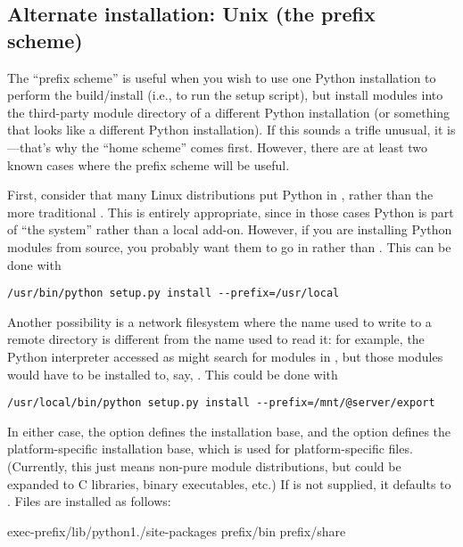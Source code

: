 \documentclass{howto}
\begin{document}
\subsection{Alternate installation: Unix (the prefix scheme)}
\label{alt-unix-home}

The ``prefix scheme'' is useful when you wish to use one Python
installation to perform the build/install (i.e., to run the setup
script), but install modules into the third-party module directory of a
different Python installation (or something that looks like a different
Python installation).  If this sounds a trifle unusual, it is---that's
why the ``home scheme'' comes first.  However, there are at least two
known cases where the prefix scheme will be useful.

First, consider that many Linux distributions put Python in ,
rather than the more traditional .  This is entirely
appropriate, since in those cases Python is part of ``the system''
rather than a local add-on.  However, if you are installing Python
modules from source, you probably want them to go in
 rather than
.  This can be done with
\begin{verbatim}
/usr/bin/python setup.py install --prefix=/usr/local
\end{verbatim}

Another possibility is a network filesystem where the name used to write
to a remote directory is different from the name used to read it: for
example, the Python interpreter accessed as 
might search for modules in ,
but those modules would have to be installed to, say,
.  This
could be done with
\begin{verbatim}
/usr/local/bin/python setup.py install --prefix=/mnt/@server/export
\end{verbatim}

In either case, the  option defines the
installation base, and the  option defines
the platform-specific installation base, which is used for
platform-specific files.  (Currently, this just means non-pure module
distributions, but could be expanded to C libraries, binary executables,
etc.)  If  is not supplied, it defaults to
.  Files are installed as follows:

              {exec-prefix}{/lib/python1./site-packages}
              {prefix}{/bin}
              {prefix}{/share}
\end{document}
